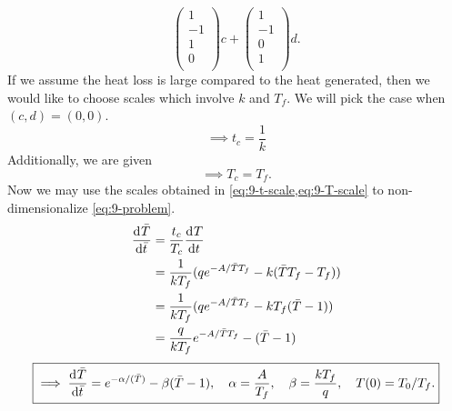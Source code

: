 \documentclass[12pt,twoside]{article}
\begin{document}
\begin{enumerate}
\begin{equation*}
\begin{pmatrix}
      1 \\ -1 \\ 1 \\ 0 \\
    \end{pmatrix}c +
    \begin{pmatrix}
      1 \\ -1 \\ 0 \\ 1 \\
    \end{pmatrix}d.
  \end{equation*}
  If we assume the heat loss is large compared to the heat generated, then we
  would like to choose scales which involve $k$ and $T_f$. We will pick the case
  when $(c,d)=(0,0)$.
  \begin{equation}
    \label{eq:9-t-scale}
    \implies t_c  = \frac{1}{k}
  \end{equation}
  Additionally, we are given
  \begin{equation}
    \label{eq:9-T-scale}
    \implies T_c  = T_f.
  \end{equation}
  Now we may use the scales obtained in \cref{eq:9-t-scale,eq:9-T-scale} to
  non-dimensionalize \cref{eq:9-problem}.
  \begin{equation*}
    \begin{aligned}
      \frac{\mathrm{d}^{} {\bar{T}}}{\mathrm{d}{\bar{t}}^{}} &= \frac{t_c}{T_c}\frac{\mathrm{d}^{} {T}}{\mathrm{d}{t}^{}} \\
      &= \frac{1}{kT_f}(qe^{-A/\bar{T}T_f} - k(\bar{T}T_f-T_f)) \\
      &= \frac{1}{kT_f}(qe^{-A/\bar{T}T_f} - kT_f(\bar{T}-1)) \\
      &= \frac{q}{kT_f}e^{-A/\bar{T}T_f} - (\bar{T}-1)
    \end{aligned}
  \end{equation*}
  \begin{equation*} \boxed{
      \implies \frac{\mathrm{d}^{} {\bar{T}}}{\mathrm{d}{\bar{t}}^{}} =
      e^{-\alpha/(\bar{T})}-\beta(\bar{T}-1), \quad \alpha = \frac{A}{T_f},
      \quad \beta = \frac{kT_f}{q}, \quad T(0) = T_0/T_f.
    }
  \end{equation*}
\end{enumerate}
\end{document}
